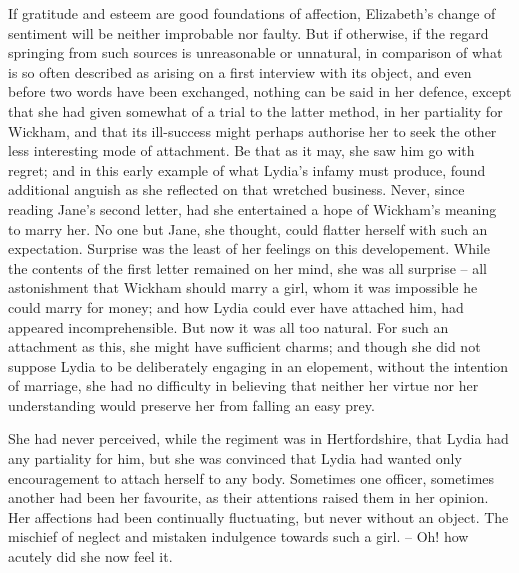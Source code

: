 If gratitude and esteem are good foundations of affection,
Elizabeth’s change of sentiment will be neither
improbable nor faulty. But if otherwise, if the regard
springing from such sources is unreasonable or unnatural,
in comparison of what is so often described as arising on
a first interview with its object, and even before two
words have been exchanged, nothing can be said in her
defence, except that she had given somewhat of a trial
to the latter method, in her partiality for Wickham, and
that its ill-success might perhaps authorise her to seek
the other less interesting mode of attachment. Be that as
it may, she saw him go with regret; and in this early
example of what Lydia’s infamy must produce, found
additional anguish as she reflected on that wretched
business. Never, since reading Jane’s second letter, had
she entertained a hope of Wickham’s meaning to marry
her. No one but Jane, she thought, could flatter herself
with such an expectation. Surprise was the least of her
feelings on this developement. While the contents of the
first letter remained on her mind, she was all surprise -- all
astonishment that Wickham should marry a girl, whom
it was impossible he could marry for money; and how
Lydia could ever have attached him, had appeared
incomprehensible. But now it was all too natural. For such
an attachment as this, she might have sufficient charms;
and though she did not suppose Lydia to be deliberately
engaging in an elopement, without the intention of
marriage, she had no difficulty in believing that neither her
virtue nor her understanding would preserve her from
falling an easy prey.

She had never perceived, while the regiment was in
Hertfordshire, that Lydia had any partiality for him, but
she was convinced that Lydia had wanted only encouragement
to attach herself to any body. Sometimes one
officer, sometimes another had been her favourite, as their
attentions raised them in her opinion. Her affections had
been continually fluctuating, but never without an object.
The mischief of neglect and mistaken indulgence towards
such a girl. -- Oh! how acutely did she now feel it.

